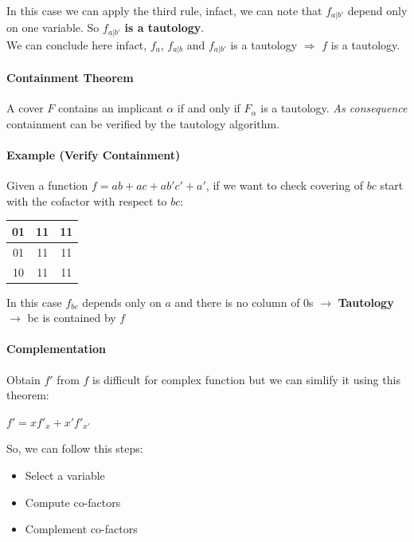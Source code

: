 In this case we can apply the third rule, infact, we can note that $f_{a|b'}$ depend only on one variable. So $f_{a|b'}$ \textbf{is a tautology}.\\

We can conclude here infact, $f_{a}$, $f_{a|b}$ and $f_{a|b'}$ is a tautology $\Longrightarrow$ $f$ is a tautology.


\paragraph{Containment Theorem} A cover $F$ contains an implicant $\alpha$ if and only if $F_{\alpha}$ is a tautology. \textit{As consequence} containment can be verified by the tautology algorithm.


\paragraph{Example (Verify Containment)} Given a function $f= ab+ac+ab'c'+a'$, if we want to check covering of $bc$ start with the cofactor with respect to $bc$: 

\begin{center}
	\begin{tabular}{c | c | c}
		01 & 11 & 11 \\ \hline
		01 & 11 & 11 \\ \hline 
		10 & 11 & 11 \\ 
	\end{tabular}
\end{center}

In this case $f_{bc}$ depends only on $a$ and there is no column of 0s $\rightarrow$ \textbf{Tautology} $\rightarrow$ bc is contained by $f$

\paragraph{Complementation} Obtain $f'$ from $f$ is difficult for complex function but we can simlify it using this theorem: 

\begin{center}
	$f' = xf'_{x} + x'f'_{x'}$
\end{center}

So, we can follow this steps: 

\begin{itemize}
	\item Select a variable
	\item Compute co-factors
	\item Complement co-factors
\end{itemize}


